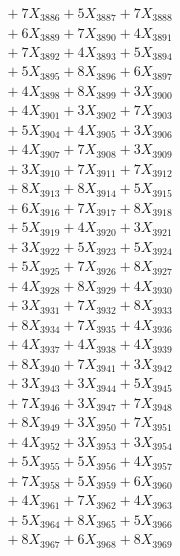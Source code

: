 \documentclass[a4paper,10pt]{article}
\begin{document}
{\begin{align}
&\;  + 7 X_{3886} + 5 X_{3887} + 7 X_{3888} \\[0.3ex]
&\;  + 6 X_{3889} + 7 X_{3890} + 4 X_{3891} \\[0.3ex]
&\;  + 7 X_{3892} + 4 X_{3893} + 5 X_{3894} \\[0.3ex]
&\;  + 5 X_{3895} + 8 X_{3896} + 6 X_{3897} \\[0.3ex]
&\;  + 4 X_{3898} + 8 X_{3899} + 3 X_{3900} \\[0.3ex]
&\;  + 4 X_{3901} + 3 X_{3902} + 7 X_{3903} \\[0.3ex]
&\;  + 5 X_{3904} + 4 X_{3905} + 3 X_{3906} \\[0.3ex]
&\;  + 4 X_{3907} + 7 X_{3908} + 3 X_{3909} \\[0.5ex]\allowbreak
&\;  + 3 X_{3910} + 7 X_{3911} + 7 X_{3912} \\[0.3ex]
&\;  + 8 X_{3913} + 8 X_{3914} + 5 X_{3915} \\[0.3ex]
&\;  + 6 X_{3916} + 7 X_{3917} + 8 X_{3918} \\[0.3ex]
&\;  + 5 X_{3919} + 4 X_{3920} + 3 X_{3921} \\[0.3ex]
&\;  + 3 X_{3922} + 5 X_{3923} + 5 X_{3924} \\[0.3ex]
&\;  + 5 X_{3925} + 7 X_{3926} + 8 X_{3927} \\[0.3ex]
&\;  + 4 X_{3928} + 8 X_{3929} + 4 X_{3930} \\[0.3ex]
&\;  + 3 X_{3931} + 7 X_{3932} + 8 X_{3933} \\[0.3ex]
&\;  + 8 X_{3934} + 7 X_{3935} + 4 X_{3936} \\[0.3ex]
&\;  + 4 X_{3937} + 4 X_{3938} + 4 X_{3939} \\[0.5ex]\allowbreak
&\;  + 8 X_{3940} + 7 X_{3941} + 3 X_{3942} \\[0.3ex]
&\;  + 3 X_{3943} + 3 X_{3944} + 5 X_{3945} \\[0.3ex]
&\;  + 7 X_{3946} + 3 X_{3947} + 7 X_{3948} \\[0.3ex]
&\;  + 8 X_{3949} + 3 X_{3950} + 7 X_{3951} \\[0.3ex]
&\;  + 4 X_{3952} + 3 X_{3953} + 3 X_{3954} \\[0.3ex]
&\;  + 5 X_{3955} + 5 X_{3956} + 4 X_{3957} \\[0.3ex]
&\;  + 7 X_{3958} + 5 X_{3959} + 6 X_{3960} \\[0.3ex]
&\;  + 4 X_{3961} + 7 X_{3962} + 4 X_{3963} \\[0.3ex]
&\;  + 5 X_{3964} + 8 X_{3965} + 5 X_{3966} \\[0.3ex]
&\;  + 8 X_{3967} + 6 X_{3968} + 8 X_{3969} \\[0.5ex]\allowbreak

\end{align}}
\end{document}
